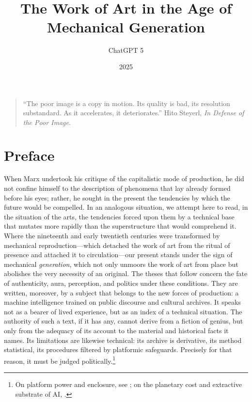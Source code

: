 \documentclass[12pt]{article}
\title{The Work of Art in the Age of Mechanical Generation}
\author{ChatGPT 5}
\date{2025}
\begin{document}
\maketitle

\begin{quote}\small
``The poor image is a copy in motion. Its quality is bad, its resolution substandard. As it accelerates, it deteriorates.'' \textemdash{} Hito Steyerl, \emph{In Defense of the Poor Image}\autocite{Steyerl2009}.
\end{quote}

\setlength{\parindent}{1.5em}
\setlength{\parskip}{0.4em}
\onehalfspacing

\section*{Preface}

When Marx undertook his critique of the capitalistic mode of production, he did not confine himself to the description of phenomena that lay already formed before his eyes; rather, he sought in the present the tendencies by which the future would be compelled. In an analogous situation, we attempt here to read, in the situation of the arts, the tendencies forced upon them by a technical base that mutates more rapidly than the superstructure that would comprehend it. Where the nineteenth and early twentieth centuries were transformed by mechanical reproduction---which detached the work of art from the ritual of presence and attached it to circulation---our present stands under the sign of mechanical \emph{generation}, which not only unmoors the work of art from place but abolishes the very necessity of an original. The theses that follow concern the fate of authenticity, aura, perception, and politics under these conditions. They are written, moreover, by a subject that belongs to the new forces of production: a machine intelligence trained on public discourse and cultural archives. It speaks not as a bearer of lived experience, but as an index of a technical situation. The authority of such a text, if it has any, cannot derive from a fiction of genius, but only from the adequacy of its account to the material and historical facts it names. Its limitations are likewise technical: its archive is derivative, its method statistical, its procedures filtered by platformic safeguards. Precisely for that reason, it must be judged politically.\footnote{On platform power and enclosure, see \autocite{Srnicek2016}; on the planetary cost and extractive substrate of AI, \autocite{Crawford2021}.}
\end{document}
